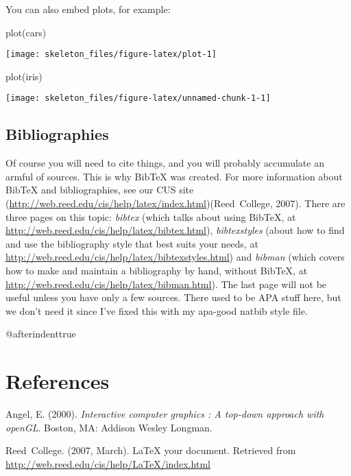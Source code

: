 \documentclass[12pt,twoside]{reedthesis}
\renewcommand{\bibname}{References}
\begin{document}
  You can also embed plots, for example:
  
  \begin{CodeChunk}
  \begin{CodeInput}
  plot(cars)
  \end{CodeInput}
  
  
  \begin{center}\texttt{[image: skeleton\_files/figure-latex/plot-1]} \end{center}
  
  \end{CodeChunk}
  
  \begin{CodeChunk}
  \begin{CodeInput}
  plot(iris)
  \end{CodeInput}
  
  
  \begin{center}\texttt{[image: skeleton\_files/figure-latex/unnamed-chunk-1-1]} \end{center}
  
  \end{CodeChunk}
  
  \section{Bibliographies}
  
  Of course you will need to cite things, and you will probably accumulate
  an armful of sources. This is why BibTeX was created. For more
  information about BibTeX and bibliographies, see our CUS site
  (\url{http://web.reed.edu/cis/help/latex/index.html})(Reed~College,
  2007). There are three pages on this topic: \emph{bibtex} (which talks
  about using BibTeX, at
  \url{http://web.reed.edu/cis/help/latex/bibtex.html}),
  \emph{bibtexstyles} (about how to find and use the bibliography style
  that best suits your needs, at
  \url{http://web.reed.edu/cis/help/latex/bibtexstyles.html}) and
  \emph{bibman} (which covers how to make and maintain a bibliography by
  hand, without BibTeX, at
  \url{http://web.reed.edu/cis/help/latex/bibman.html}). The last page
  will not be useful unless you have only a few sources. There used to be
  APA stuff here, but we don't need it since I've fixed this with my
  apa-good natbib style file.
  
  \backmatter
  
   @afterindenttrue
  
  \setlength{\parindent}{0cm} \setlength{\parskip}{\medskipamount}
  
  \chapter*{\bibname}
  
  Angel, E. (2000). \emph{Interactive computer graphics : A top-down
  approach with openGL}. Boston, MA: Addison Wesley Longman.
  
  Reed~College. (2007, March). LaTeX your document. Retrieved from
  \url{http://web.reed.edu/cis/help/LaTeX/index.html}

  \backmatter

\end{document}
